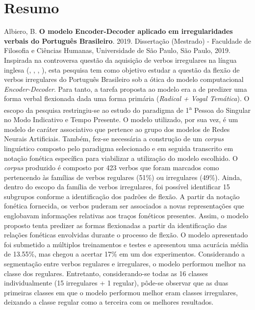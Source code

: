 \documentclass[12pt,twoside,a4paper]{book}
\newcommand{\aup}{\textsuperscript}
\begin{document}
 


\chapter*{Resumo}
\noindent Albiero, B. \textbf{O modelo Encoder-Decoder aplicado em irregularidades verbais do Português Brasileiro}. 
2019.
Dissertação (Mestrado) - Faculdade de Filosofia e Ciências Humanas,
Universidade de São Paulo, São Paulo, 2019.
\\

Inspirada na controversa questão da aquisição de verbos irregulares na língua inglesa (\cite{chomsky:1968},  \cite{Pinker:1988},
\cite{Albright2003RulesVA}, \cite{kirov:2018}), esta pesquisa tem como objetivo estudar a questão da flexão de verbos irregulares do Português Brasileiro sob a ótica do modelo computacional \textit{Encoder-Decoder}. Para tanto, a tarefa proposta ao modelo era a de predizer uma forma verbal flexionada dada uma forma primária (\textit{Radical + Vogal Temática}). O escopo da pesquisa restringiu-se ao estudo do paradigma de 1\aup{a} Pessoa do Singular no Modo Indicativo e Tempo Presente. O modelo utilizado, por sua vez, é um modelo de caráter associativo que pertence ao grupo dos modelos de Redes Neurais Artificiais. Também, fez-se necessária a construção de um \textit{corpus} linguístico composto pelo paradigma selecionado e em seguida transcrito em notação fonética específica para viabilizar a utilização do modelo escolhido. O \textit{corpus} produzido é composto por 423 verbos que foram marcados como pertencendo às famílias de verbos regulares (51\%) ou irregulares (49\%). Ainda, dentro do escopo da família de verbos irregulares, foi possível identificar 15 subgrupos conforme a identificação dos padrões de flexão. A partir da notação fonética fornecida, os verbos puderam ser associados a novas representações que englobavam informações relativas aos traços fonéticos presentes. Assim, o modelo proposto tenta predizer as formas flexionadas a partir da identificação das relações fonéticas envolvidas durante o processo de flexão. O modelo apresentado foi submetido a múltiplos treinamentos e testes e apresentou uma acurácia média de 13.55\%, mas chegou a acertar 17\% em um dos experimentos. Considerando a segmentação entre verbos regulares e irregulares, o modelo performou melhor na classe dos regulares. Entretanto, considerando-se todas as 16 classes individualmente (15 irregulares + 1 regular), pôde-se observar que as duas primeiras classes em que o modelo performou melhor eram classes irregulares, deixando a classe regular como a terceira com os melhores resultados.
\end{document}
